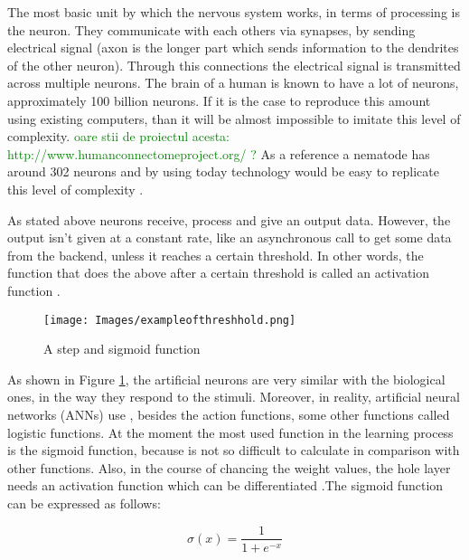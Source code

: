 The most basic unit by which the nervous system works, in terms of processing is the neuron. They communicate with each others via synapses, by sending electrical signal (axon is the longer part which sends information to the dendrites of the other neuron). Through this connections the electrical signal is transmitted  across multiple neurons. The brain of a human is known to have a lot of neurons, approximately 100 billion neurons. If it is the case to reproduce this amount using existing computers, than it will be almost impossible to imitate this level of complexity. \textcolor{green}{oare stii de proiectul acesta: http://www.humanconnectomeproject.org/ ?}
As a reference a nematode has around 302 neurons and by using today technology would be easy to replicate this level of complexity \cite{ANNBasic}.\par

As stated above neurons receive, process and give an output data. However, the output isn't given at a constant rate, like an asynchronous call to get some data from the backend, unless it reaches a certain threshold. In other words, the function that does the above after a certain threshold is called an activation function \cite{ANNBasic}. 

\begin{figure}[h!]
    \centering
    \texttt{[image: Images/exampleofthreshhold.png]}
    \caption{A step and sigmoid function \cite{ANNBasic}}
    \label{fig:ex_threshold}
\end{figure}

As shown in Figure \ref{fig:ex_threshold}, the artificial neurons are very similar with the biological ones, in the way they respond to the stimuli. Moreover, in reality, artificial neural networks (ANNs) use , besides the action functions, some other functions called logistic functions. At the moment the most used function in the learning process is the sigmoid function, because is not so difficult to calculate in comparison with other functions. Also, in the course of chancing the weight values, the hole layer needs an activation function which can be differentiated \cite{ANNBasic}.The sigmoid function can be expressed as follows: 

\begin{center}
    \begin{equation}
        \ensuremath{\sigma}(x) =\frac{1}{1 + e^{-x}}
    \end{equation}
\end{center}

